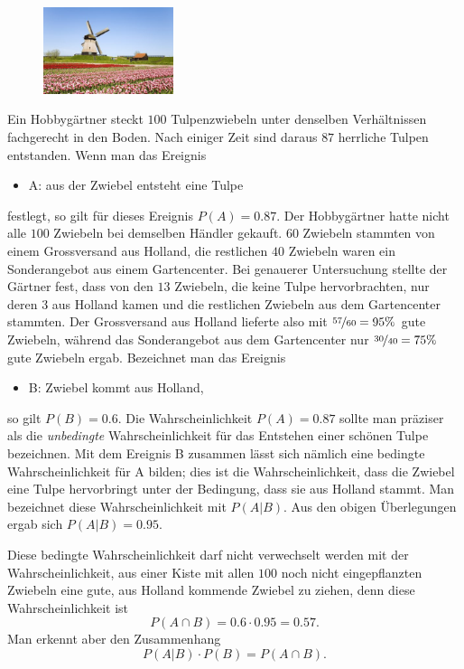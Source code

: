 \documentclass[%
11pt,%
twoside,%
titlepage,%
german,%
headsepline%
]{scrartcl}
\begin{document}
\begin{figure}
  \begin{center}
    \includegraphics[width=0.34\textwidth]{pictures/tulpen}
  \end{center}
\end{figure}
Ein Hobbygärtner steckt $100$ Tulpenzwiebeln unter denselben Verhältnissen fachgerecht in den Boden. Nach einiger Zeit sind daraus $87$ herrliche Tulpen entstanden. Wenn man das Ereignis
\begin{itemize}
    \item[] A: aus der Zwiebel entsteht eine Tulpe
\end{itemize}
festlegt, so gilt für dieses Ereignis $P(A)=0.87$.
Der Hobbygärtner hatte nicht alle $100$ Zwiebeln bei demselben Händler gekauft. $60$ Zwiebeln stammten von einem Grossversand aus Holland, die restlichen $40$ Zwiebeln waren ein Sonderangebot aus einem Gartencenter. Bei genauerer Untersuchung stellte der Gärtner fest, dass von den $13$ Zwiebeln, die keine Tulpe hervorbrachten, nur deren $3$ aus Holland kamen und die restlichen Zwiebeln aus dem Gartencenter stammten. Der Grossversand aus Holland lieferte also mit $\nicefrac{57}{60}=95\%$ gute Zwiebeln, während das Sonderangebot aus dem Gartencenter nur $\nicefrac{30}{40}=75\%$ gute Zwiebeln ergab. Bezeichnet man das Ereignis
\begin{itemize}
    \item[] B: Zwiebel kommt aus Holland,
\end{itemize}
so gilt $P(B)=0.6$.
Die Wahrscheinlichkeit $P(A)=0.87$ sollte man präziser als die \emph{unbedingte} Wahrscheinlichkeit für das Entstehen einer schönen Tulpe bezeichnen. Mit dem Ereignis B zusammen lässt sich nämlich eine bedingte Wahrscheinlichkeit für A bilden; dies ist die Wahrscheinlichkeit, dass die Zwiebel eine Tulpe hervorbringt unter der Bedingung, dass sie aus Holland stammt. Man bezeichnet diese Wahrscheinlichkeit mit $P(A|B)$.
Aus den obigen Überlegungen ergab sich $P(A|B)=0.95$.

Diese bedingte Wahrscheinlichkeit darf nicht verwechselt werden mit der Wahrscheinlichkeit, aus einer Kiste mit allen $100$ noch nicht eingepflanzten Zwiebeln eine gute, aus Holland kommende Zwiebel zu ziehen, denn diese Wahrscheinlichkeit ist
$$P(A\cap B)=0.6\cdot0.95 = 0.57.$$
Man erkennt aber den Zusammenhang
$$P(A|B)\cdot P(B)=P(A\cap B).$$
\end{document}
